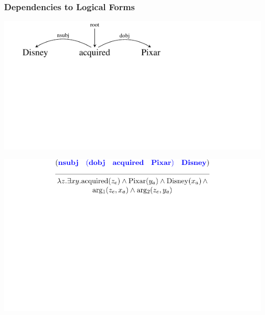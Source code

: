 \documentclass[mathserif,12pt]{beamer}
\begin{document}
\begin{frame}
\frametitle{Dependencies to Logical Forms}
\begin{center}
\vspace{1em}
\includegraphics[trim=2em 9.4em 10em 0em,clip=true,scale=1.3]{figures/pixar}

\vspace{4cm}

\includegraphics[trim=7em 10em 7em 2.5em,clip=true,scale=1.1]{figures/dependency-transitive-derivation_full}
\vspace{-2cm}
\end{center}
\end{frame}
\end{document}
